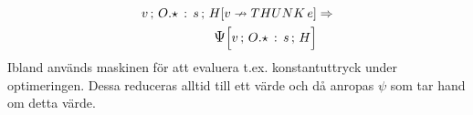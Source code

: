 \documentclass[../Optimise]{subfiles}
\begin{document}
\begin{align}
\mc v{O.\star\,:\, s}{\nheap v{\THUNK e}} & \Rightarrow\\
\PSI{O.\star\,:\, s}Hv \nonumber
\end{align}
Ibland används maskinen för att evaluera t.ex. konstantuttryck under optimeringen.
Dessa reduceras alltid till ett värde och då anropas $\psi$ som tar hand 
om detta värde.

%
%
%
%
%

%
\end{document}
